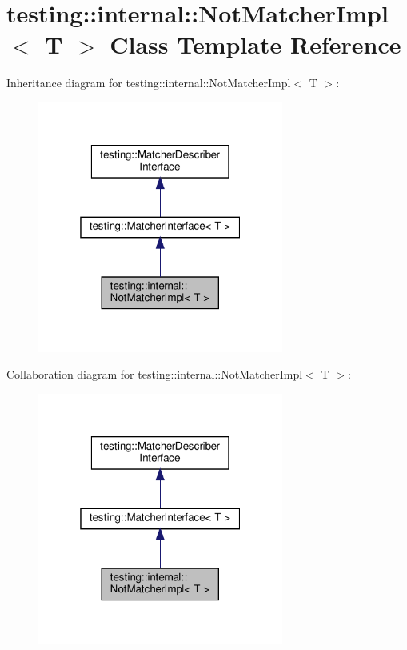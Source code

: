 \hypertarget{classtesting_1_1internal_1_1_not_matcher_impl}{}\section{testing\+:\+:internal\+:\+:Not\+Matcher\+Impl$<$ T $>$ Class Template Reference}
\label{classtesting_1_1internal_1_1_not_matcher_impl}


Inheritance diagram for testing\+:\+:internal\+:\+:Not\+Matcher\+Impl$<$ T $>$\+:
\nopagebreak
\begin{figure}[H]
\begin{center}
\leavevmode
\includegraphics[width=229pt]{classtesting_1_1internal_1_1_not_matcher_impl__inherit__graph}
\end{center}
\end{figure}


Collaboration diagram for testing\+:\+:internal\+:\+:Not\+Matcher\+Impl$<$ T $>$\+:
\nopagebreak
\begin{figure}[H]
\begin{center}
\leavevmode
\includegraphics[width=229pt]{classtesting_1_1internal_1_1_not_matcher_impl__coll__graph}
\end{center}
\end{figure}
